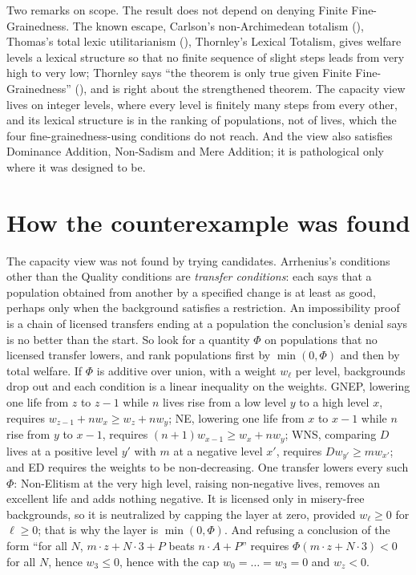 \documentclass[
  11pt,
  letterpaper,
  DIV=11,
  numbers=noendperiod,
  twoside]{scrartcl}
\begin{document}
Two remarks on scope. The result does not depend on denying Finite
Fine-Grainedness. The known escape, Carlson's non-Archimedean totalism
(), Thomas's total lexic
utilitarianism (), Thornley's
Lexical Totalism, gives welfare levels a lexical structure so that no
finite sequence of slight steps leads from very high to very low;
Thornley says ``the theorem is only true given Finite Fine-Grainedness''
(), and is right about
the strengthened theorem. The capacity view lives on integer levels,
where every level is finitely many steps from every other, and its
lexical structure is in the ranking of populations, not of lives, which
the four fine-grainedness-using conditions do not reach. And the view
also satisfies Dominance Addition, Non-Sadism and Mere Addition; it is
pathological only where it was designed to be.

\section{How the counterexample was found}\label{sec-method}

The capacity view was not found by trying candidates. Arrhenius's
conditions other than the Quality conditions are \emph{transfer
conditions}: each says that a population obtained from another by a
specified change is at least as good, perhaps only when the background
satisfies a restriction. An impossibility proof is a chain of licensed
transfers ending at a population the conclusion's denial says is no
better than the start. So look for a quantity \(\Phi\) on populations
that no licensed transfer lowers, and rank populations first by
\(\min(0, \Phi)\) and then by total welfare. If \(\Phi\) is additive
over union, with a weight \(w_\ell\) per level, backgrounds drop out and
each condition is a linear inequality on the weights. GNEP, lowering one
life from \(z\) to \(z-1\) while \(n\) lives rise from a low level \(y\)
to a high level \(x\), requires \(w_{z-1} + n w_x \geq w_z + n w_y\);
NE, lowering one life from \(x\) to \(x-1\) while \(n\) rise from \(y\)
to \(x-1\), requires \((n+1) w_{x-1} \geq w_x + n w_y\); WNS, comparing
\(D\) lives at a positive level \(y'\) with \(m\) at a negative level
\(x'\), requires \(D w_{y'} \geq m w_{x'}\); and ED requires the weights
to be non-decreasing. One transfer lowers every such \(\Phi\):
Non-Elitism at the very high level, raising non-negative lives, removes
an excellent life and adds nothing negative. It is licensed only in
misery-free backgrounds, so it is neutralized by capping the layer at
zero, provided \(w_\ell \geq 0\) for \(\ell \geq 0\); that is why the
layer is \(\min(0,\Phi)\). And refusing a conclusion of the form ``for
all \(N\), \(m \cdot z + N \cdot 3 + P\) beats \(n \cdot A + P\)''
requires \(\Phi(m \cdot z + N \cdot 3) < 0\) for all \(N\), hence
\(w_3 \leq 0\), hence with the cap \(w_0 = \dots = w_3 = 0\) and
\(w_z < 0\).
\end{document}
